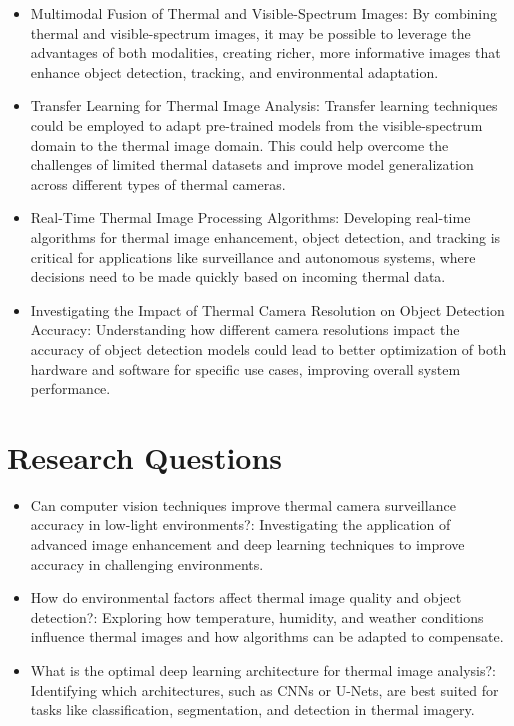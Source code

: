 \documentclass[11pt,a4paper]{report}
\begin{document}
\begin{itemize}  
    \item Multimodal Fusion of Thermal and Visible-Spectrum Images: By combining thermal and visible-spectrum images, it may be possible to leverage the advantages of both modalities, creating richer, more informative images that enhance object detection, tracking, and environmental adaptation.

    \item Transfer Learning for Thermal Image Analysis: Transfer learning techniques could be employed to adapt pre-trained models from the visible-spectrum domain to the thermal image domain. This could help overcome the challenges of limited thermal datasets and improve model generalization across different types of thermal cameras.

    \item Real-Time Thermal Image Processing Algorithms: Developing real-time algorithms for thermal image enhancement, object detection, and tracking is critical for applications like surveillance and autonomous systems, where decisions need to be made quickly based on incoming thermal data.

    \item Investigating the Impact of Thermal Camera Resolution on Object Detection Accuracy: Understanding how different camera resolutions impact the accuracy of object detection models could lead to better optimization of both hardware and software for specific use cases, improving overall system performance.
\end{itemize}

\section{Research Questions}

\begin{itemize}  
    \item Can computer vision techniques improve thermal camera surveillance accuracy in low-light environments?: Investigating the application of advanced image enhancement and deep learning techniques to improve accuracy in challenging environments.

    \item How do environmental factors affect thermal image quality and object detection?: Exploring how temperature, humidity, and weather conditions influence thermal images and how algorithms can be adapted to compensate.

    \item What is the optimal deep learning architecture for thermal image analysis?: Identifying which architectures, such as CNNs or U-Nets, are best suited for tasks like classification, segmentation, and detection in thermal imagery.
\end{itemize}
\end{document}
